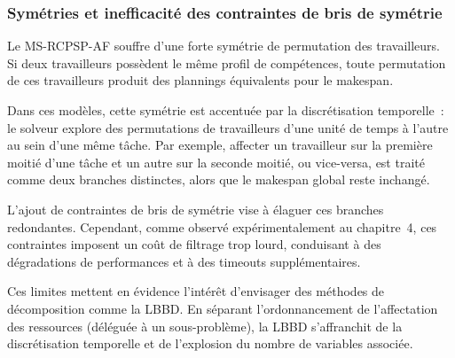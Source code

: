 \subsubsection{Symétries et inefficacité des contraintes de bris de symétrie}

Le MS-RCPSP-AF souffre d'une forte symétrie de permutation des travailleurs. Si deux travailleurs possèdent le même profil de compétences, toute permutation de ces travailleurs produit des plannings équivalents pour le makespan.

\bigskip

Dans ces modèles, cette symétrie est accentuée par la discrétisation \mbox {temporelle :}
le solveur explore des permutations de travailleurs d'une unité de temps à l'autre au sein d'une même tâche. Par exemple, affecter un travailleur sur la première moitié d'une tâche et un autre sur la seconde moitié, ou vice-versa, est traité comme deux branches distinctes, alors que le makespan global reste inchangé.

\bigskip

L'ajout de contraintes de bris de symétrie vise à élaguer ces branches redondantes. Cependant, comme observé expérimentalement au chapitre~4, ces contraintes imposent un coût de filtrage trop lourd, conduisant à des dégradations de performances et à des timeouts supplémentaires.

\bigskip

Ces limites mettent en évidence l'intérêt d'envisager des méthodes de décomposition comme la LBBD. En séparant l'ordonnancement de l'affectation des ressources (déléguée à un sous-problème), la LBBD s'affranchit de la discrétisation temporelle et de l'explosion du nombre de variables associée.
